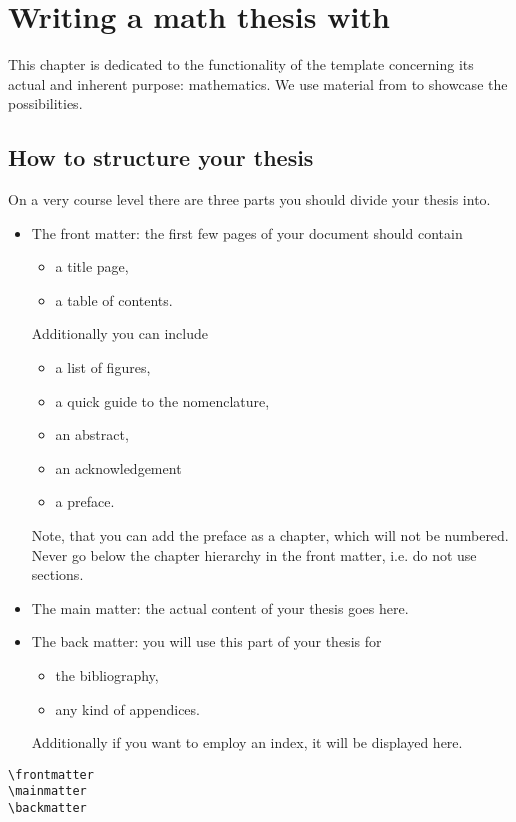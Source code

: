 \chapter{Writing a math thesis with \texttt{\classname}}\label{ch:math}
This chapter is dedicated to the functionality of the template concerning its actual and 
inherent purpose: mathematics. We use material from \cite{FineProp2015} to showcase 
the possibilities.
\section{How to structure your thesis}
On a very course level there are three parts you should divide your thesis into. 
\begin{itemize}
\item The front matter: the first few pages of your document should contain 
\begin{itemize}
\item a title page,
\item a table of contents. 
\end{itemize}
Additionally you can include
\begin{itemize}
\item a list of figures, 
\item a quick guide to the nomenclature, 
\item an abstract, 
\item an acknowledgement
\item a preface.
\end{itemize}
Note, that you can add the preface as a chapter, which will not be numbered. 
Never go below the chapter hierarchy in the front matter, i.e. do not use sections.
\item The main matter: the actual content of your thesis goes here.
\item The back matter: you will use this part of your thesis for 
\begin{itemize}
\item the bibliography,
\item any kind of appendices.
\end{itemize}
Additionally if you want to employ an index, it will be displayed here.
\end{itemize}
\begin{emphBox}
\lstinline|\frontmatter|\\
\lstinline|\mainmatter|\\
\lstinline|\backmatter|
\end{emphBox}
